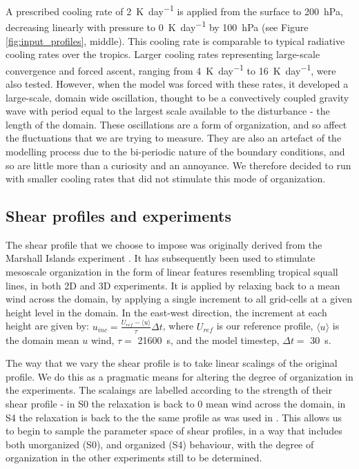 \documentclass[11pt,a4paper]{article}
\newcommand\todo[1]{\textbf{TODO: #1}}
\begin{document}
A prescribed cooling rate of \SI{2}{K.day^{-1}} is applied from the surface to \SI{200}{hPa}, decreasing linearly with pressure to \SI{0}{K.day^{-1}} by \SI{100}{hPa} (see Figure \ref{fig:input_profiles}, middle). This cooling rate is comparable to typical radiative cooling rates over the tropics. Larger cooling rates representing large-scale convergence and forced ascent, ranging from \SI{4}{K.day^{-1}} to \SI{16}{K.day^{-1}}, were also tested. However, when the model was forced with these rates, it developed a large-scale, domain wide oscillation, thought to be a convectively coupled gravity wave with period equal to the largest scale available to the disturbance - the length of the domain. These oscillations are a form of organization, and so affect the fluctuations that we are trying to measure. They are also an artefact of the modelling process due to the bi-periodic nature of the boundary conditions, and so are little more than a curiosity and an annoyance. We therefore decided to run with smaller cooling rates that did not stimulate this mode of organization.

\subsection{Shear profiles and experiments}

The shear profile that we choose to impose was originally derived from the Marshall Islands experiment \parencite{yanai1973determination}. It has subsequently been used to stimulate mesoscale organization in the form of linear features resembling tropical squall lines, in both 2D \parencite{tompkins2000impact} and 3D \parencite{grabowski1996long, CC2006II} experiments. It is applied by relaxing back to a mean wind across the domain, by applying a single increment to all grid-cells at a given height level in the domain. In the east-west direction, the increment at each height are given by: $u_{inc} = \frac{U_{ref} - \langle u \rangle}{\tau} \Delta t$, where $U_{ref}$ is our reference profile, $\langle u \rangle$ is the domain mean $u$ wind, $\tau = $ \SI{21600}{s}, and the model timestep, $\Delta t = $ \SI{30}{s}. 

The way that we vary the shear profile is to take linear scalings of the original profile. We do this as a pragmatic means for altering the degree of organization in the experiments. The scalaings are labelled according to the strength of their shear profile - in S0 the relaxation is back to 0 mean wind across the domain, in S4 the relaxation is back to the the same profile as was used in \cite{CC2006II, tompkins2000impact}. This allows us to begin to sample the parameter space of shear profiles, in a way that includes both unorganized (S0), and organized (S4) behaviour, with the degree of organization in the other experiments still to be determined.
\end{document}
